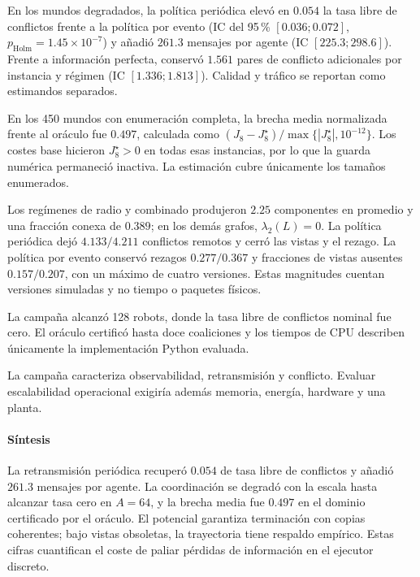 \begin{table}[!htbp]
  \centering
  \caption{Calidad y coste medios de los métodos ejecutados en E8.}
  \label{tab:sp8-results}
  \resizebox{0.94\textwidth}{!}{}
  \viuownsource
\end{table}


En los mundos degradados, la política periódica elevó en $0.054$ la tasa libre de conflictos frente a la política por evento (IC del 95\,\% $[0.036;0.072]$, $p_{\mathrm{Holm}}=1.45\times10^{-7}$) y añadió $261.3$ mensajes por agente (IC $[225.3;298.6]$). Frente a información perfecta, conservó $1.561$ pares de conflicto adicionales por instancia y régimen (IC $[1.336;1.813]$). Calidad y tráfico se reportan como estimandos separados.


En los 450 mundos con enumeración completa, la brecha media normalizada frente al oráculo fue $0.497$, calculada como $(J_8-J_8^\star)/\max\{|J_8^\star|,10^{-12}\}$. Los costes base hicieron $J_8^\star>0$ en todas esas instancias, por lo que la guarda numérica permaneció inactiva. La estimación cubre únicamente los tamaños enumerados.

Los regímenes de radio y combinado produjeron $2.25$ componentes en promedio y una fracción conexa de $0.389$; en los demás grafos, $\lambda_2(L)=0$.
La política periódica dejó $4.133/4.211$ conflictos remotos y cerró las vistas y el rezago.
La política por evento conservó rezagos $0.277/0.367$ y fracciones de vistas ausentes $0.157/0.207$, con un máximo de cuatro versiones. Estas magnitudes cuentan versiones simuladas y no tiempo o paquetes físicos.

La campaña alcanzó 128 robots, donde la tasa libre de conflictos nominal fue cero. El oráculo certificó hasta doce coaliciones y los tiempos de CPU describen únicamente la implementación Python evaluada.


La campaña caracteriza observabilidad, retransmisión y conflicto. Evaluar escalabilidad operacional exigiría además memoria, energía, hardware y una planta.

\paragraph{Síntesis}

La retransmisión periódica recuperó $0.054$ de tasa libre de conflictos y añadió $261.3$ mensajes por agente. La coordinación se degradó con la escala hasta alcanzar tasa cero en $A=64$, y la brecha media fue $0.497$ en el dominio certificado por el oráculo. El potencial garantiza terminación con copias coherentes; bajo vistas obsoletas, la trayectoria tiene respaldo empírico. Estas cifras cuantifican el coste de paliar pérdidas de información en el ejecutor discreto.
